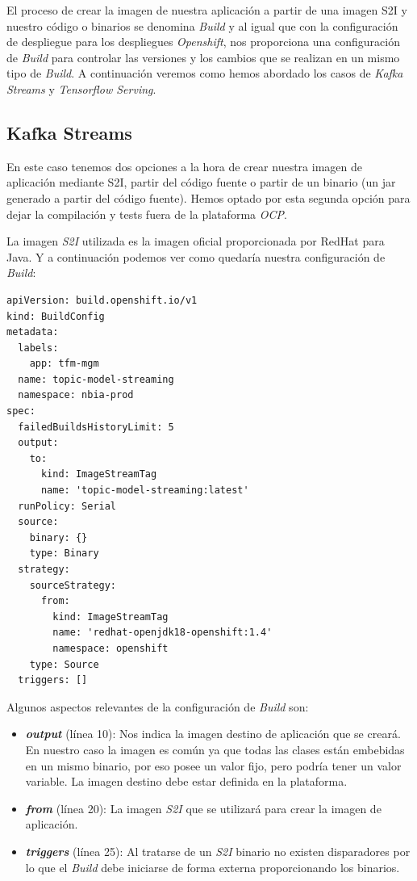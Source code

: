 El proceso de crear la imagen de nuestra aplicación a partir de una imagen S2I y nuestro código o binarios se denomina \textit{Build} y al igual que con la configuración de despliegue para los despliegues \textit{Openshift}, nos proporciona una configuración de \textit{Build} para controlar las versiones y los cambios que se realizan en un mismo tipo de \textit{Build}. A continuación veremos como hemos abordado los casos de \textit{Kafka Streams} y \textit{Tensorflow Serving}.


\subsection{Kafka Streams}

En este caso tenemos dos opciones a la hora de crear nuestra imagen de aplicación mediante S2I, partir del código fuente o partir de un binario (un jar generado a partir del código fuente). Hemos optado por esta segunda opción para dejar la compilación y tests fuera de la plataforma \textit{OCP}. 

La imagen \textit{S2I} utilizada es la imagen oficial proporcionada por RedHat para Java. Y a continuación podemos ver como quedaría nuestra configuración de \textit{Build}:

\begin{verbatim}
apiVersion: build.openshift.io/v1
kind: BuildConfig
metadata:
  labels:
    app: tfm-mgm
  name: topic-model-streaming
  namespace: nbia-prod
spec:
  failedBuildsHistoryLimit: 5
  output:
    to:
      kind: ImageStreamTag
      name: 'topic-model-streaming:latest'
  runPolicy: Serial
  source:
    binary: {}
    type: Binary
  strategy:
    sourceStrategy:
      from:
        kind: ImageStreamTag
        name: 'redhat-openjdk18-openshift:1.4'
        namespace: openshift
    type: Source
  triggers: []
\end{verbatim}

Algunos aspectos relevantes de la configuración de \textit{Build} son:

\begin{itemize}
\item \textit{\textbf{output}} (línea 10): Nos indica la imagen destino de aplicación que se creará. En nuestro caso la imagen es común ya que todas las clases están embebidas en un mismo binario, por eso posee un valor fijo, pero podría tener un valor variable. La imagen destino debe estar definida en la plataforma. 

\item \textit{\textbf{from}} (línea 20): La imagen \textit{S2I} que se utilizará para crear la imagen de aplicación.

\item \textit{\textbf{triggers}} (línea 25): Al tratarse de un \textit{S2I} binario no existen disparadores por lo que el \textit{Build} debe iniciarse de forma externa proporcionando los binarios.
 
\end{itemize}


